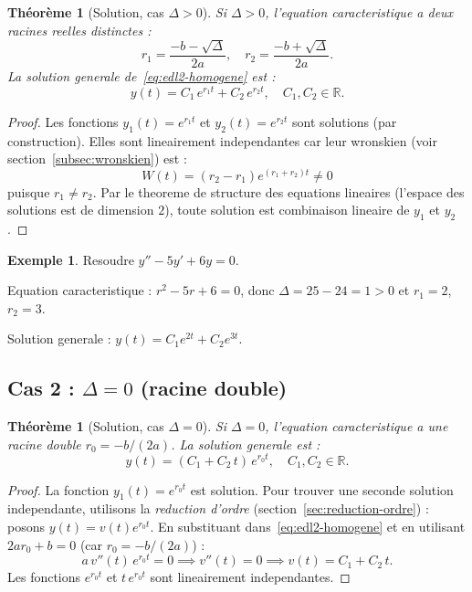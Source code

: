 \documentclass[12pt,a4paper,openany]{book}
\theoremstyle{definition}
\newtheorem{exemple}[definition]{Exemple}
\theoremstyle{plain}
\newtheorem{theoreme}[definition]{Théorème}
\theoremstyle{remark}
\newcommand{\R}{\mathbb{R}}
\begin{document}
\begin{theoreme}[Solution, cas $\Delta > 0$]\label{thm:delta-pos}
Si $\Delta > 0$, l'equation caracteristique a deux racines reelles distinctes :
\[
  r_1 = \frac{-b - \sqrt{\Delta}}{2a}, \quad r_2 = \frac{-b + \sqrt{\Delta}}{2a}.
\]
La solution generale de~\eqref{eq:edl2-homogene} est :
\begin{equation}\label{eq:sol-delta-pos}
  y(t) = C_1\, e^{r_1 t} + C_2\, e^{r_2 t}, \quad C_1, C_2 \in \R.
\end{equation}
\end{theoreme}

\begin{proof}
Les fonctions $y_1(t) = e^{r_1 t}$ et $y_2(t) = e^{r_2 t}$ sont solutions (par construction). Elles sont lineairement independantes car leur wronskien (voir section~\ref{subsec:wronskien}) est :
\[
  W(t) = (r_2 - r_1) e^{(r_1 + r_2)t} \neq 0
\]
puisque $r_1 \neq r_2$. Par le theoreme de structure des equations lineaires (l'espace des solutions est de dimension $2$), toute solution est combinaison lineaire de $y_1$ et $y_2$.
\end{proof}

\begin{exemple}\label{ex:delta-pos}
Resoudre $y'' - 5y' + 6y = 0$.

Equation caracteristique : $r^2 - 5r + 6 = 0$, donc $\Delta = 25 - 24 = 1 > 0$ et $r_1 = 2$, $r_2 = 3$.

Solution generale : $y(t) = C_1 e^{2t} + C_2 e^{3t}$.
\end{exemple}

\subsection{Cas 2 : $\Delta = 0$ (racine double)}\label{subsec:delta-nul}

\begin{theoreme}[Solution, cas $\Delta = 0$]\label{thm:delta-zero}
Si $\Delta = 0$, l'equation caracteristique a une racine double $r_0 = -b/(2a)$. La solution generale est :
\begin{equation}\label{eq:sol-delta-zero}
  y(t) = (C_1 + C_2\, t)\, e^{r_0 t}, \quad C_1, C_2 \in \R.
\end{equation}
\end{theoreme}

\begin{proof}
La fonction $y_1(t) = e^{r_0 t}$ est solution. Pour trouver une seconde solution independante, utilisons la \emph{reduction d'ordre} (section~\ref{sec:reduction-ordre}) : posons $y(t) = v(t) e^{r_0 t}$. En substituant dans~\eqref{eq:edl2-homogene} et en utilisant $2ar_0 + b = 0$ (car $r_0 = -b/(2a)$) :
\[
  a\, v''(t)\, e^{r_0 t} = 0 \implies v''(t) = 0 \implies v(t) = C_1 + C_2\, t.
\]
Les fonctions $e^{r_0 t}$ et $t\, e^{r_0 t}$ sont lineairement independantes.
\end{proof}
\end{document}
